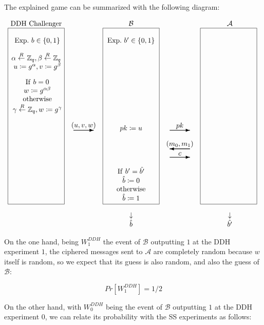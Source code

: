\documentclass{article}
\newcommand{\verylongrightarrow}[1]     %
    {\setlength{\unitlength}{.01in}     %
     \begin{picture}(#1,1) \put(0,0){\thicklines\vector(1,0){#1}} \end{picture}}
\newcommand{\rightgoing}[2]{{\stackrel{{\displaystyle #1}} {\verylongrightarrow{#2}}}}
\newcommand{\verylongleftarrow}[1]
    {\setlength{\unitlength}{.01in}
         \begin{picture}(#1,1) \put(#1,0){\thicklines\vector(-1,0){#1}} \end{picture}}
\newcommand{\leftgoing}[2]{{\stackrel{{\displaystyle #1}} {\verylongleftarrow{#2}}}}
\begin{document}
The explained game can be summarized with the following diagram:

\[
\begin{array}{ccccc}
{\rm DDH \ Challenger} & 
  & \mathcal{B} & 
  & \mathcal{A}\\
\multirow{2}{*}
{\framebox(80,250){}}
&
&
\multirow{2}{*}
{\framebox(80,250){}}
&
& 
\multirow{2}{*}
{\framebox(80,250){}
}\\
~
  {\rm Exp.} \ b \in \{0,1\}
&
& {\rm Exp. } \ b' \in \{0,1\}
&
&
\\[10pt]
  \alpha \stackrel{R}{\leftarrow} \mathbb{Z}_q, 
  \beta \stackrel{R}{\leftarrow} \mathbb{Z}_q
&
&
&
&
\\ 
~
u \coloneqq g^\alpha, v \coloneqq g^\beta
& 
&
&
&
\\[10pt]
~
  {\rm If} \ b = 0
& 
&
&
&
\\
~ 
w \coloneqq g^{\alpha\beta}
&
&
&
& 
\\
~ 
{\rm otherwise}
&
&
&
& 
\\
~ 
\gamma \stackrel{R}{\leftarrow} \mathbb{Z}_q, 
w \coloneqq g^\gamma
&
&
&
& 
\\[10pt]
~ 
& \rightgoing{(u, v, w)}{40}
& pk \coloneqq u
& \rightgoing{pk}{40}
& 
\\[10pt]
~
&
& 
&\leftgoing{(m_{0},m_{1})}{40}
&
\\
~
&
&
&\rightgoing{c}{40}
&
\\[10pt]
~
&
& {\rm If}\ b'=\hat{b'} 
&
&
\\
~
&
& \hat{b} \coloneqq 0
&
&
\\
~
&
& {\rm otherwise}
&
&
\\
~
&
& \hat{b} \coloneqq 1
&
&
\\
\\
&
&
\downarrow
&
&
\downarrow
\\
&
&
\hat{b}
&
&
\hat{b'}
\\
\end{array}
\]

On the one hand, being $W_1^{DDH}$ the event of $\mathcal{B}$ 
outputting $1$ at the DDH experiment $1$, the ciphered messages 
sent to $\mathcal{A}$ are completely random because $w$ itself is 
random, so we expect that its guess is also random, and also 
the guess of $\mathcal{B}$:

$$Pr\left[W_1^{DDH}\right] = 1 / 2$$

On the other hand, with $W_0^{DDH}$ being the event of 
$\mathcal{B}$ outputting $1$ at the DDH experiment $0$,
we can relate its probability with the SS experiments 
as follows:
\end{document}
